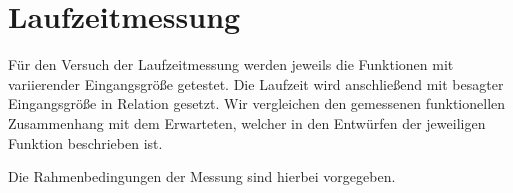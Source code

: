 \documentclass[11pt]{article}
\begin{document}
    \section{Laufzeitmessung}\label{sec:laufzeitmessung}

    Für den Versuch der Laufzeitmessung werden jeweils die Funktionen mit variierender Eingangsgröße getestet. Die Laufzeit wird anschließend mit besagter Eingangsgröße in Relation gesetzt.
    Wir vergleichen den gemessenen funktionellen Zusammenhang mit dem Erwarteten, welcher in den Entwürfen der jeweiligen Funktion beschrieben ist.

    Die Rahmenbedingungen der Messung sind hierbei vorgegeben.
\end{document}
